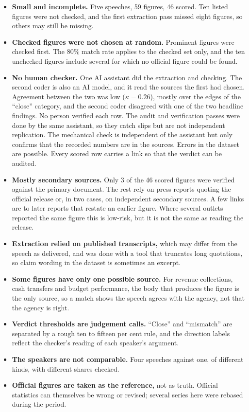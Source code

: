 \documentclass[11pt]{article}
\begin{document}
\begin{itemize}
\item \textbf{Small and incomplete.} Five speeches, 59 figures, 46 scored. Ten listed figures were not checked, and the first extraction pass missed eight figures, so others may still be missing.
\item \textbf{Checked figures were not chosen at random.} Prominent figures were checked first. The 80\% match rate applies to the checked set only, and the ten unchecked figures include several for which no official figure could be found.
\item \textbf{No human checker.} One AI assistant did the extraction and checking. The second coder is also an AI model, and it read the sources the first had chosen. Agreement between the two was low ($\kappa = 0.26$), mostly over the edges of the ``close'' category, and the second coder disagreed with one of the two headline findings. No person verified each row. The audit and verification passes were done by the same assistant, so they catch slips but are not independent replication. The mechanical check is independent of the assistant but only confirms that the recorded numbers are in the sources. Errors in the dataset are possible. Every scored row carries a link so that the verdict can be audited.
\item \textbf{Mostly secondary sources.} Only 3 of the 46 scored figures were verified against the primary document. The rest rely on press reports quoting the official release or, in two cases, on independent secondary sources. A few links are to later reports that restate an earlier figure. Where several outlets reported the same figure this is low-risk, but it is not the same as reading the release.
\item \textbf{Extraction relied on published transcripts,} which may differ from the speech as delivered, and was done with a tool that truncates long quotations, so claim wording in the dataset is sometimes an excerpt.
\item \textbf{Some figures have only one possible source.} For revenue collections, cash transfers and budget performance, the body that produces the figure is the only source, so a match shows the speech agrees with the agency, not that the agency is right.
\item \textbf{Verdict thresholds are judgement calls.} ``Close'' and ``mismatch'' are separated by a rough ten to fifteen per cent rule, and the direction labels reflect the checker's reading of each speaker's argument.
\item \textbf{The speakers are not comparable.} Four speeches against one, of different kinds, with different shares checked.
\item \textbf{Official figures are taken as the reference,} not as truth. Official statistics can themselves be wrong or revised; several series here were rebased during the period.
\end{itemize}
\end{document}

